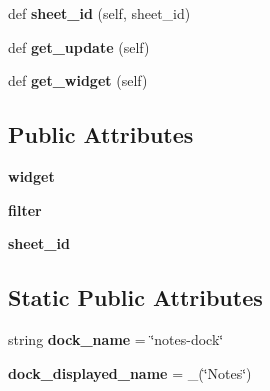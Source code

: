 \begin{DoxyCompactItemize}
\item 
def {\bfseries sheet\+\_\+id} (self, sheet\+\_\+id)\hypertarget{classnotes__dock_1_1_gui_notes_dock_a6edf7c6391c4d57e2fc552ccce07c0ac}{}\label{classnotes__dock_1_1_gui_notes_dock_a6edf7c6391c4d57e2fc552ccce07c0ac}

\item 
def {\bfseries get\+\_\+update} (self)\hypertarget{classnotes__dock_1_1_gui_notes_dock_a22ec88a4bf1b14a1d23f2e8a8b62b694}{}\label{classnotes__dock_1_1_gui_notes_dock_a22ec88a4bf1b14a1d23f2e8a8b62b694}

\item 
def {\bfseries get\+\_\+widget} (self)\hypertarget{classnotes__dock_1_1_gui_notes_dock_a6b96e34ae55957ddd3cdf93a854a7b7c}{}\label{classnotes__dock_1_1_gui_notes_dock_a6b96e34ae55957ddd3cdf93a854a7b7c}

\end{DoxyCompactItemize}
\subsection*{Public Attributes}
\begin{DoxyCompactItemize}
\item 
{\bfseries widget}\hypertarget{classnotes__dock_1_1_gui_notes_dock_ad01126194cff8fddb322f628863015f9}{}\label{classnotes__dock_1_1_gui_notes_dock_ad01126194cff8fddb322f628863015f9}

\item 
{\bfseries filter}\hypertarget{classnotes__dock_1_1_gui_notes_dock_a70b01909d17d2cc24382def6026ec359}{}\label{classnotes__dock_1_1_gui_notes_dock_a70b01909d17d2cc24382def6026ec359}

\item 
{\bfseries sheet\+\_\+id}\hypertarget{classnotes__dock_1_1_gui_notes_dock_a9a036b3b14ce9c74253ae6447178ca63}{}\label{classnotes__dock_1_1_gui_notes_dock_a9a036b3b14ce9c74253ae6447178ca63}

\end{DoxyCompactItemize}
\subsection*{Static Public Attributes}
\begin{DoxyCompactItemize}
\item 
string {\bfseries dock\+\_\+name} = \char`\"{}notes-\/dock\char`\"{}\hypertarget{classnotes__dock_1_1_gui_notes_dock_a46ace4306647d25cf2c6d4324a6cb3a0}{}\label{classnotes__dock_1_1_gui_notes_dock_a46ace4306647d25cf2c6d4324a6cb3a0}

\item 
{\bfseries dock\+\_\+displayed\+\_\+name} = \+\_\+(\char`\"{}Notes\char`\"{})\hypertarget{classnotes__dock_1_1_gui_notes_dock_a9a6457844481e52b6bbfbec07d878d96}{}\label{classnotes__dock_1_1_gui_notes_dock_a9a6457844481e52b6bbfbec07d878d96}

\end{DoxyCompactItemize}


